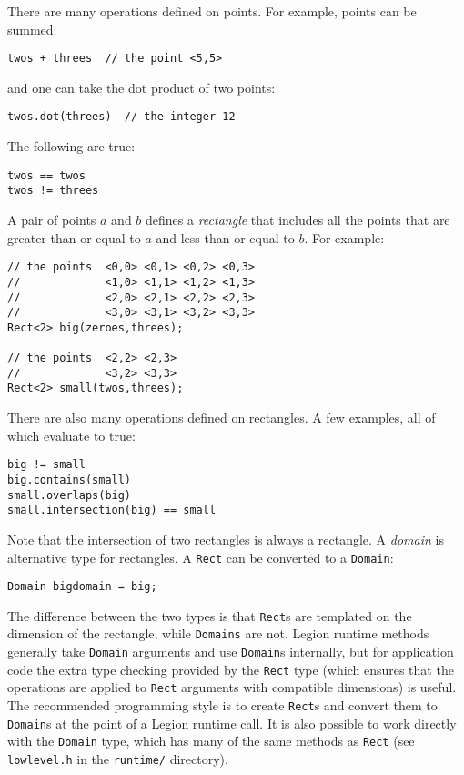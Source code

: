 There are many operations defined on points.  For example, points can be summed:
\begin{verbatim}
twos + threes  // the point <5,5>
\end{verbatim}
and one can take the dot product of two points:             
\begin{verbatim}
twos.dot(threes)  // the integer 12
\end{verbatim}
The following are true:
\begin{verbatim}
twos == twos   
twos != threes 
\end{verbatim}
A pair of points $a$ and $b$ defines a {\em rectangle} that includes all the points that are greater than or equal to $a$
and less than or equal to $b$.  For example:
\begin{verbatim}
// the points  <0,0> <0,1> <0,2> <0,3> 
//             <1,0> <1,1> <1,2> <1,3>
//             <2,0> <2,1> <2,2> <2,3>
//             <3,0> <3,1> <3,2> <3,3>
Rect<2> big(zeroes,threes);  

// the points  <2,2> <2,3>
//             <3,2> <3,3>
Rect<2> small(twos,threes);
\end{verbatim}
There are also many operations defined on rectangles.  A few examples, all of which evaluate to true:
\begin{verbatim}
big != small                       
big.contains(small)                
small.overlaps(big)                
small.intersection(big) == small   
\end{verbatim}
Note that the intersection of two rectangles is always a rectangle.
A {\em domain} is alternative type for rectangles.  A {\tt Rect} can be converted to a {\tt Domain}:
\begin{verbatim}
Domain bigdomain = big;
\end{verbatim}
The difference between the two types is that {\tt Rect}s are templated on the dimension of the rectangle, while {\tt Domains}
are not.  Legion runtime methods generally take {\tt Domain} arguments and use {\tt Domain}s internally, but for application
code the extra type checking provided by the {\tt Rect} type (which ensures that the operations are applied to {\tt Rect} arguments
with compatible dimensions) is useful.  The recommended programming style is to create {\tt Rect}s and convert them to {\tt Domain}s
at the point of a Legion runtime call.  It is also possible to work directly with the {\tt Domain} type, which has many
of the same methods as {\tt Rect} (see {\tt lowlevel.h} in the {\tt runtime/} directory).

